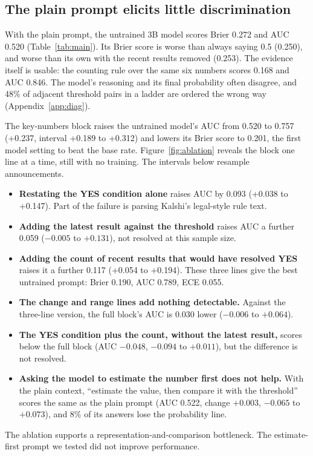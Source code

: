 \documentclass[11pt]{article}
\begin{document}
\subsection{The plain prompt elicits little discrimination}
\label{sec:elicitation}

With the plain prompt, the untrained 3B model scores Brier 0.272 and AUC 0.520 (Table~\ref{tab:main}). Its Brier score is worse than always saying 0.5 (0.250), and worse than its own with the recent results removed (0.253). The evidence itself is usable: the counting rule over the same six numbers scores 0.168 and AUC 0.846. The model's reasoning and its final probability often disagree, and 48\% of adjacent threshold pairs in a ladder are ordered the wrong way (Appendix~\ref{app:diag}).

The key-numbers block raises the untrained model's AUC from 0.520 to 0.757 (+0.237, interval +0.189 to +0.312) and lowers its Brier score to 0.201, the first model setting to beat the base rate. Figure~\ref{fig:ablation} reveals the block one line at a time, still with no training. The intervals below resample announcements.
\begin{itemize}[leftmargin=*]
\item \textbf{Restating the YES condition alone} raises AUC by 0.093 (+0.038 to +0.147). Part of the failure is parsing Kalshi's legal-style rule text.
\item \textbf{Adding the latest result against the threshold} raises AUC a further 0.059 ($-0.005$ to $+0.131$), not resolved at this sample size.
\item \textbf{Adding the count of recent results that would have resolved YES} raises it a further 0.117 (+0.054 to +0.194). These three lines give the best untrained prompt: Brier 0.190, AUC 0.789, ECE 0.055.
\item \textbf{The change and range lines add nothing detectable.} Against the three-line version, the full block's AUC is 0.030 lower ($-0.006$ to $+0.064$).
\item \textbf{The YES condition plus the count, without the latest result,} scores below the full block (AUC $-0.048$, $-0.094$ to $+0.011$), but the difference is not resolved.
\item \textbf{Asking the model to estimate the number first does not help.} With the plain context, ``estimate the value, then compare it with the threshold'' scores the same as the plain prompt (AUC 0.522, change $+0.003$, $-0.065$ to $+0.073$), and 8\% of its answers lose the probability line.
\end{itemize}
The ablation supports a representation-and-comparison bottleneck. The estimate-first prompt we tested did not improve performance.
\end{document}
